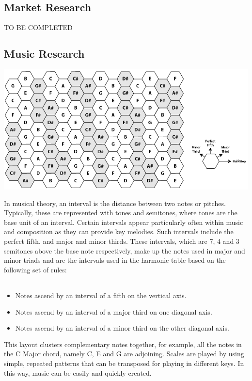 \documentclass[10pt,a4paper]{article}
\begin{document}
\subsection{Market Research}
TO BE COMPLETED
\subsection{Music Research}
\begin{center}
\includegraphics[scale=0.5]{5.png}
\end{center}
In musical theory, an interval is the distance between two notes or pitches. Typically, these are represented with tones and semitones, where tones are the base unit of an interval. Certain intervals appear particularly often within music and composition as they can provide key melodies. Such intervals include the perfect fifth, and major and minor thirds. These intervals, which are 7, 4 and 3 semitones above the base note respectively, make up the notes used in major and minor triads and are the intervals used in the harmonic table based on the following set of rules:\\
\\
\begin{itemize}
\item Notes ascend by an interval of a fifth on the vertical axis.
\item Notes ascend by an interval of a major third on one diagonal axis.
\item Notes ascend by an interval of a minor third on the other diagonal axis.
\end{itemize}
This layout clusters complementary notes together, for example, all the notes in the C Major chord, namely C, E and G are adjoining. Scales are played by using simple, repeated patterns that can be transposed for playing in different keys. In this way, music can be easily and quickly created.\\
\end{document}
